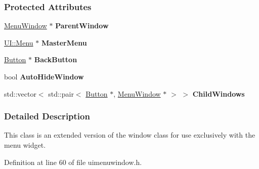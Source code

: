 \subsubsection*{Protected Attributes}
\begin{DoxyCompactItemize}
\item 
\hypertarget{classphys_1_1UI_1_1MenuWindow_a94ec8861afbc6f39ac4b443a912bc0c1}{
\hyperlink{classphys_1_1UI_1_1MenuWindow}{MenuWindow} $\ast$ {\bfseries ParentWindow}}
\label{d4/d07/classphys_1_1UI_1_1MenuWindow_a94ec8861afbc6f39ac4b443a912bc0c1}

\item 
\hypertarget{classphys_1_1UI_1_1MenuWindow_adeed2fd68308846df8885febee141111}{
\hyperlink{classphys_1_1UI_1_1Menu}{UI::Menu} $\ast$ {\bfseries MasterMenu}}
\label{d4/d07/classphys_1_1UI_1_1MenuWindow_adeed2fd68308846df8885febee141111}

\item 
\hypertarget{classphys_1_1UI_1_1MenuWindow_a02826ad4a8d0b8934a7dbe86e4ea3edf}{
\hyperlink{classphys_1_1UI_1_1Button}{Button} $\ast$ {\bfseries BackButton}}
\label{d4/d07/classphys_1_1UI_1_1MenuWindow_a02826ad4a8d0b8934a7dbe86e4ea3edf}

\item 
\hypertarget{classphys_1_1UI_1_1MenuWindow_a7bceef4e75b7f179fb2b71f822c376fd}{
bool {\bfseries AutoHideWindow}}
\label{d4/d07/classphys_1_1UI_1_1MenuWindow_a7bceef4e75b7f179fb2b71f822c376fd}

\item 
\hypertarget{classphys_1_1UI_1_1MenuWindow_ae55c88520920e44c0bb125e812d62272}{
std::vector$<$ std::pair$<$ \hyperlink{classphys_1_1UI_1_1Button}{Button} $\ast$, \hyperlink{classphys_1_1UI_1_1MenuWindow}{MenuWindow} $\ast$ $>$ $>$ {\bfseries ChildWindows}}
\label{d4/d07/classphys_1_1UI_1_1MenuWindow_ae55c88520920e44c0bb125e812d62272}

\end{DoxyCompactItemize}


\subsubsection{Detailed Description}
This class is an extended version of the window class for use exclusively with the menu widget. 

Definition at line 60 of file uimenuwindow.h.



